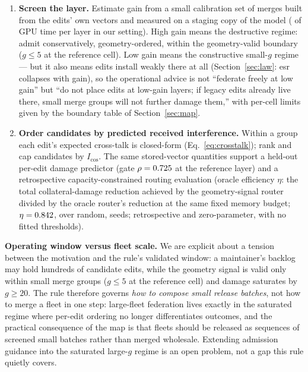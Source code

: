 \documentclass[preprint,12pt]{elsarticle}
\begin{document}
\begin{enumerate}
\item \textbf{Screen the layer.} Estimate gain from a small calibration set of merges
built from the edits' own vectors and measured on a staging copy of the model
(\calibTime{} of GPU time per layer in our setting). High gain means the destructive regime: admit conservatively, geometry-ordered,
within the geometry-valid boundary ($g\leq5$ at the reference cell). Low gain means the
constructive small-$g$ regime --- but it also means edits install weakly there at all
(Section~\ref{sec:law}: esr collapses with gain), so the operational advice is not
``federate freely at low gain'' but ``do not place edits at low-gain layers; if
legacy edits already live there, small merge groups will not further damage them,''
with per-cell limits given by the boundary table of Section~\ref{sec:map}.
\item \textbf{Order candidates by predicted received interference.} Within a group each
edit's expected cross-talk is closed-form (Eq.~\ref{eq:crosstalk}); rank and cap candidates
by $I_{\cos}$. The same stored-vector quantities support a held-out per-edit damage
predictor (gate $\rho=0.725{}$ at the reference layer) and a retrospective
capacity-constrained routing evaluation (oracle efficiency $\eta$: the total
collateral-damage reduction achieved by the geometry-signal router divided by the
oracle router's reduction at the same fixed memory budget; $\eta=0.842{}$,
\routingMargin{} over random, \routingSeeds{} seeds; retrospective and zero-parameter, with
no fitted thresholds).
\end{enumerate}

\textbf{Operating window versus fleet scale.} We are explicit about a tension between
the motivation and the rule's validated window: a maintainer's backlog may hold
hundreds of candidate edits, while the geometry signal is valid only within small
merge groups ($g\leq5$ at the reference cell) and damage saturates by $g\geq20$. The
rule therefore governs \emph{how to compose small release batches}, not how to merge
a fleet in one step: large-fleet federation lives exactly in the saturated regime
where per-edit ordering no longer differentiates outcomes, and the practical
consequence of the map is that fleets should be released as sequences of screened
small batches rather than merged wholesale. Extending admission guidance into the
saturated large-$g$ regime is an open problem, not a gap this rule quietly covers.
\end{document}
